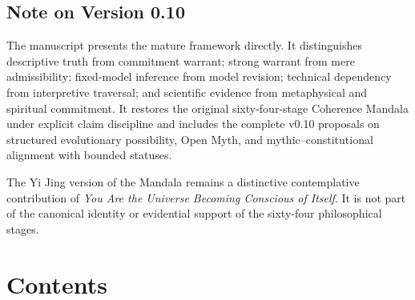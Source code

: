 \documentclass[
  11pt,
]{article}
\begin{document}
\subsection{Note on Version 0.10}\label{note-on-version-0.10}

The manuscript presents the mature framework directly. It distinguishes
descriptive truth from commitment warrant; strong warrant from mere
admissibility; fixed-model inference from model revision; technical
dependency from interpretive traversal; and scientific evidence from
metaphysical and spiritual commitment. It restores the original
sixty-four-stage Coherence Mandala under explicit claim discipline and
includes the complete v0.10 proposals on structured evolutionary
possibility, Open Myth, and mythic--constitutional alignment with
bounded statuses.

The Yi Jing version of the Mandala remains a distinctive contemplative
contribution of \emph{You Are the Universe Becoming Conscious of
Itself}. It is not part of the canonical identity or evidential support
of the sixty-four philosophical stages.

\section{Contents}\label{contents}
\end{document}
